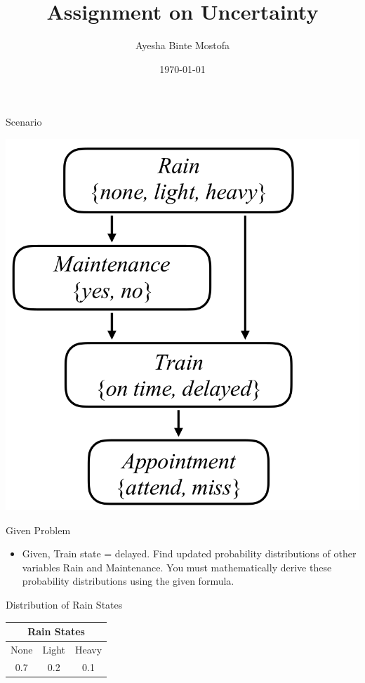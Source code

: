 \documentclass{beamer}
\title{Assignment on Uncertainty}
\author{Ayesha Binte Mostofa \newline 1805062}
\institute
{
  Department of Computer Science and Engineering\\
  Bangladesh University of Engineering and Technology
}
\date{\today}
\begin{document}
\maketitle
\begin{frame}{Scenario}
\begin{center}
    \includegraphics[scale=.25]{data.png}
\end{center}
\end{frame}
\begin{frame}{Given Problem}
\begin{itemize}
    \item  Given, Train state = delayed. Find updated probability distributions of other variables Rain and Maintenance. You must mathematically derive these probability distributions using the given formula.
\end{itemize}

\end{frame}
\begin{frame}{Distribution of Rain States}
\begin{center}
    \begin{tabular}{|c|c|c|}
         \hline
         \multicolumn{3}{|c|}{Rain States}\\
         \hline
         None & Light  & Heavy  \\
         \hline
         0.7 & 0.2  & 0.1  \\
         \hline
    \end{tabular}
\end{center}    
\end{frame}
\end{document}
